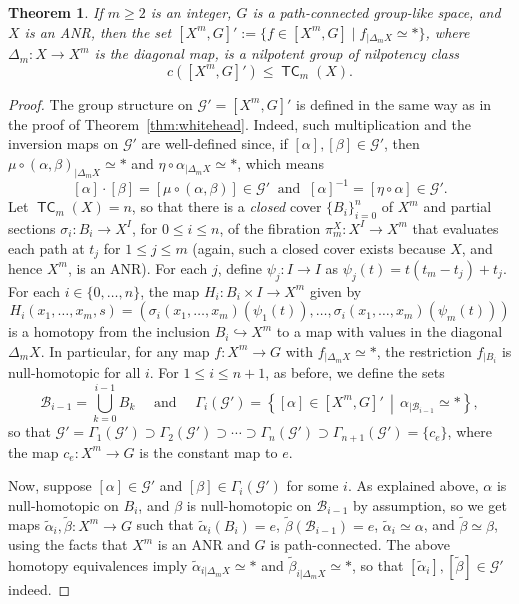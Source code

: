 \documentclass[amscd,amssymb,verbatim,10pt]{amsart}
\numberwithin{equation}{section}
\theoremstyle{plain}
\newtheorem{theorem}{Theorem}[section]
\theoremstyle{definition}
\DeclareMathOperator{\TC}{{\mathsf{TC}}}
\newcommand{\cB}{{\mathcal{B}}}
\newcommand{\cG}{{\mathcal{G}}}
\def\wt{\widetilde}
\begin{document}
\begin{theorem}\label{thm: tc whitehead}
If $m\ge 2$ is an integer, $G$ is a path-connected group-like space, and $X$ is an ANR, then the set $[X^m,G]':=\{f\in [X^m,G]\mid f_{|\Delta_m X}\simeq\ast \}$, where 
$\Delta_m\colon X\to X^m$ is the diagonal map,  is a nilpotent group of nilpotency class 
\[
c([X^m,G]') \leq \TC_m(X).
\]
\end{theorem}
\begin{proof}
    The group structure on $\cG'=[X^m,G]'$ is defined in the same way as in the proof of Theorem~\ref{thm:whitehead}. Indeed, such multiplication and the inversion maps on $\cG'$ are well-defined since, if $[\alpha],[\beta]\in\cG'$, then $\mu\circ (\alpha, \beta)_{|\Delta_mX}\simeq\ast$ and $\eta\circ \alpha_{|\Delta_mX}\simeq\ast$, which means 
    \[
    [\alpha] \cdot [\beta] = [\mu\circ (\alpha, \beta)]\in\cG'\ \text{ and }\ [\alpha]^{-1}=[\eta\circ \alpha]\in\cG'.
    \]
Let $\TC_m(X)=n$, so that there is a \emph{closed} cover $\{B_i\}_{i=0}^{n}$ of $X^m$ and partial sections $\sigma_i\colon B_i\to X^I$, for $0\le i \le n$, of the fibration $\pi^X_m\colon X^I\to X^m$ that evaluates each path at $t_j$ for $1\le j \le m$ (again, such a closed cover exists because $X$, and hence $X^m$, is an ANR). For each $j$, define $\psi_j\colon I\to I$ as $\psi_j(t)=t(t_m-t_j)+t_j$. For each $i \in\{0,\dots, n\}$, the map $H_i\colon B_i\times I \to X^m$ given by
\[
H_i(x_1,\ldots,x_m,s)=\left(\sigma_i(x_1,\ldots,x_m)(\psi_1(t)),\ldots,\sigma_i(x_1,\ldots,x_m)(\psi_m(t))\right)
\]
is a homotopy from the inclusion $B_i\hookrightarrow X^m$ to a map with values in the diagonal $\Delta_mX$. In particular, for any map $f\colon X^m\to G$ with $f_{|\Delta_mX}\simeq \ast$, the restriction $f_{|B_i}$ is null-homotopic for all $i$. For $1\le i \le n+1$, as before, we define the sets
\[
\cB_{i-1} = \bigcup_{k=0}^{i-1}B_k \quad \text{ and }\quad \Gamma_i(\cG') = \left\{[\alpha]\in [X^m,G]'\,\middle|\, \alpha_{|\cB_{i-1}} \simeq *\right\},
\]
so that $\cG'=\Gamma_1(\cG')\supset
\Gamma_{2}(\cG') \supset \cdots\supset\Gamma_n(\cG')\supset\Gamma_{n+1}(\cG')=\{c_e\}$, where the map $c_e\colon X^m\to G$ is the constant map to $e$.

Now, suppose $[\alpha]\in \cG'$ and $[\beta]\in \Gamma_i(\cG')$ for some $i$. As explained above, $\alpha$ is null-homotopic on $B_i$, and $\beta$ is null-homotopic on $\cB_{i-1}$ by assumption, so we get maps $\wt\alpha_i,\wt\beta\colon X^m\to G$ such that $\wt \alpha_i(B_i)=e$, $\wt\beta (\cB_{i-1})=e$, $\wt \alpha_i\simeq\alpha$, and $\wt\beta\simeq\beta$, using the facts that $X^m$ is an ANR and $G$ is path-connected. The above homotopy equivalences imply $\wt\alpha_{i|\Delta_mX}\simeq \ast$ and $\wt\beta_{i|\Delta_mX}\simeq \ast$, so that $[\wt\alpha_i],[\wt\beta]\in\cG'$ indeed.


\end{proof}
\end{document}
